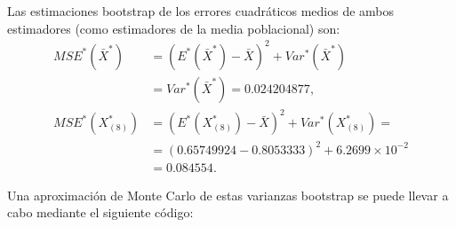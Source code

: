 \documentclass[]{book}
\theoremstyle{definition}
\theoremstyle{definition}
\theoremstyle{definition}
\theoremstyle{remark}
\begin{document}
Las estimaciones bootstrap de los errores cuadráticos medios de ambos
estimadores (como estimadores de la media poblacional) son:
\[\begin{aligned}
MSE^{\ast}\left( \bar{X}^{\ast} \right) &= \left( E^{\ast}\left( 
\bar{X}^{\ast} \right) -\bar{X} \right)^2+Var^{\ast}\left( 
\bar{X}^{\ast} \right) \\
&= Var^{\ast}\left( \bar{X}^{\ast} \right) =0.024204877, \\
MSE^{\ast}\left( X_{\left( 8 \right)}^{\ast} \right) &= \left( E^{\ast
}\left( X_{\left( 8 \right)}^{\ast} \right) -\bar{X} \right)
^2+Var^{\ast}\left( X_{\left( 8 \right)}^{\ast} \right) = \\
&= \left( 0.65749924-0.8053333 \right)^2+6.2699 \times 10^{-2}\\
&=  0.084554.
\end{aligned}\]

Una aproximación de Monte Carlo de estas varianzas bootstrap se puede
llevar a cabo mediante el siguiente código:
\end{document}
